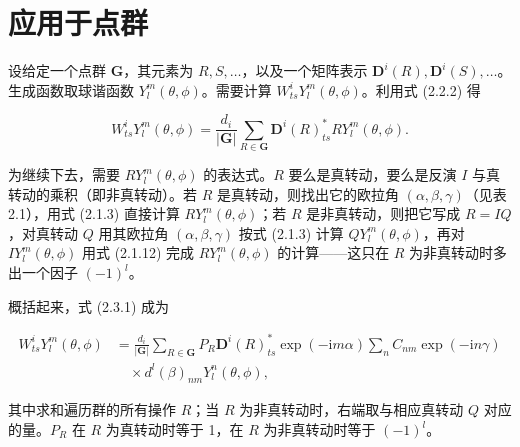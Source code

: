 \section{应用于点群}

设给定一个点群 $\mathbf{G}$，其元素为 $R, S, \ldots$，以及一个矩阵表示 $\mathbf{D}^{i}(R), \mathbf{D}^{i}(S), \ldots$。生成函数取球谐函数 $Y_{l}^{m}(\theta, \phi)$。需要计算 $W_{ts}^{i}Y_{l}^{m}(\theta, \phi)$。利用式 (2.2.2) 得

\begin{equation*}
W_{ts}^{i}Y_{l}^{m}(\theta, \phi) = \frac{d_{i}}{|\mathbf{G}|} \sum_{R \in \mathbf{G}} \mathbf{D}^{i}(R)_{ts}^{*} RY_{l}^{m}(\theta, \phi).
\tag{2.3.1}
\end{equation*}

为继续下去，需要 $RY_{l}^{m}(\theta, \phi)$ 的表达式。$R$ 要么是真转动，要么是反演 $I$ 与真转动的乘积（即非真转动）。若 $R$ 是真转动，则找出它的欧拉角 $(\alpha, \beta, \gamma)$（见表 2.1），用式 (2.1.3) 直接计算 $RY_{l}^{m}(\theta, \phi)$；若 $R$ 是非真转动，则把它写成 $R = IQ$，对真转动 $Q$ 用其欧拉角 $(\alpha, \beta, \gamma)$ 按式 (2.1.3) 计算 $QY_{l}^{m}(\theta, \phi)$，再对 $IY_{l}^{m}(\theta, \phi)$ 用式 (2.1.12) 完成 $RY_{l}^{m}(\theta, \phi)$ 的计算——这只在 $R$ 为非真转动时多出一个因子 $(-1)^{l}$。

概括起来，式 (2.3.1) 成为

\begin{equation*}
\begin{aligned}
W_{ts}^{i}Y_{l}^{m}(\theta, \phi) &= \frac{d_{i}}{|\mathbf{G}|} \sum_{R \in \mathbf{G}} P_{R}\mathbf{D}^{i}(R)_{ts}^{*}\exp(-\mathrm{i}m\alpha)\sum_{n} C_{nm}\exp(-\mathrm{i}n\gamma) \\
&\quad \times d^{l}(\beta)_{nm}Y_{l}^{n}(\theta, \phi),
\end{aligned}
\tag{2.3.2}
\end{equation*}

其中求和遍历群的所有操作 $R$；当 $R$ 为非真转动时，右端取与相应真转动 $Q$ 对应的量。$P_{R}$ 在 $R$ 为真转动时等于 1，在 $R$ 为非真转动时等于 $(-1)^{l}$。
